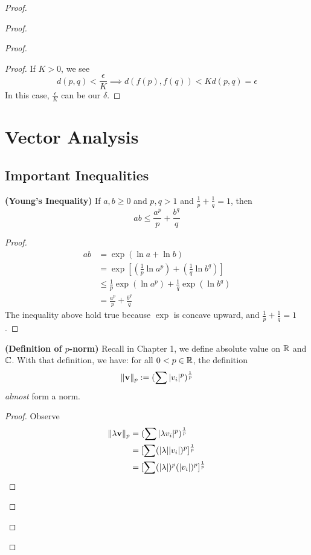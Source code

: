 \documentclass{report}
\begin{document}
\begin{proof}
\begin{proof}
\begin{proof}
\begin{proof}
If $K>0$, we see 
\begin{equation*}
d(p,q)<\frac{\epsilon}{K}\implies d(f(p),f(q))<Kd(p,q)=\epsilon 
\end{equation*}
In this case, $\frac{\epsilon}{K}$ can be our $\delta$. 
\end{proof}



\chapter{Vector Analysis}
\section{Important Inequalities}
\begin{theorem}
\label{6.1.1}
\textbf{(Young's Inequality)} If $a,b\geq 0$ and $p,q>1$ and  $\frac{1}{p}+\frac{1}{q}=1$, then
\begin{equation}
ab\leq \frac{a^p}{p}+\frac{b^q}{q}
\end{equation}
\end{theorem}
\begin{proof}
\begin{align}
  ab&=\exp(\ln a+ \ln b)\\
    &=\exp[(\frac{1}{p}\ln a^p)+(\frac{1}{q}\ln b^q)]\\
&\leq \frac{1}{p}\exp(\ln a^p)+\frac{1}{q}\exp(\ln b^q)\\
&= \frac{a^p}{p}+\frac{b^q}{q}
\end{align}
The inequality above hold true because  $\exp$ is concave upward, and $\frac{1}{p}+\frac{1}{q}=1$. 
\end{proof}
\begin{theorem}
\label{6.1.2}
\textbf{(Definition of $p$-norm)} Recall in Chapter 1, we define absolute value on $\mathbb{R}$ and  $\mathbb{C}$. With that definition, we have: for all $0<p \in \mathbb{R}$, the definition
\begin{equation}
  \| \textbf{v} \|_p:= (\sum |v_i|^p)^{\frac{1}{p}}
\end{equation}
\textit{almost} form a norm.
\end{theorem}
\begin{proof}
Observe 
\begin{align}
\norm{\ld \vecta{v}}_p&=(\sum \abso{\ld v_i}^p)^{\frac{1}{p}} \\
&=[\sum (\abso{\ld }\abso{v_i})^p]^{\frac{1}{p}}\\
&=[\sum (\abso{\ld })^p(\abso{v_i})^p]^{\frac{1}{p}}\\

\end{align}
\end{proof}
\end{proof}
\end{proof}
\end{proof}
\end{document}

